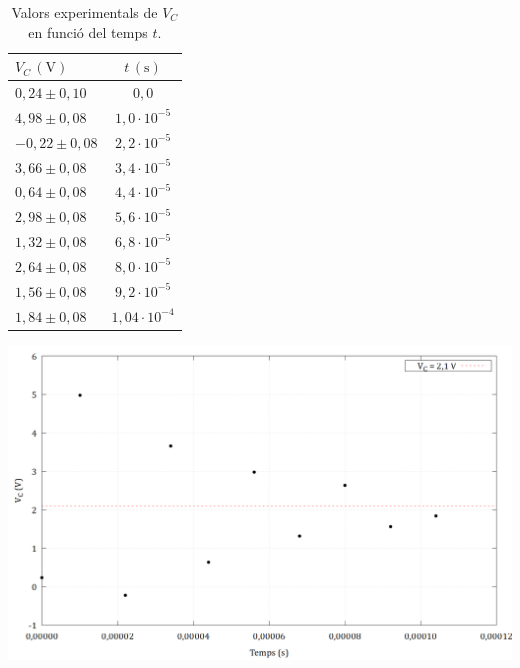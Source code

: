 \documentclass[a4paper,10.5pt]{report}
\begin{document}
\begin{table}[H]
	\centering
	\small
	\begin{minipage}{0.28\textwidth}
		\centering
		\caption{Valors experimentals de $V_C$ en funció del temps $t$.}
		\begin{tabular}{lc}
			\toprule
			$V_C \, (\text{V})$ & $t\,(\text{s})$ \\
			\midrule
			$0{,}24 \pm 0{,}10$ & $0{,}0 $ \\
			$4{,}98 \pm 0{,}08$ & $1{,}0 \cdot 10^{-5}$ \\
			$-0{,}22 \pm 0{,}08$ & $2{,}2 \cdot 10^{-5}$ \\
			$3{,}66 \pm 0{,}08$ & $3{,}4 \cdot 10^{-5}$ \\
			$0{,}64 \pm 0{,}08$ & $4{,}4 \cdot 10^{-5}$ \\
			$2{,}98 \pm 0{,}08$ & $5{,}6 \cdot 10^{-5}$ \\
			$1{,}32 \pm 0{,}08$ & $6{,}8 \cdot 10^{-5}$ \\
			$2{,}64 \pm 0{,}08$ & $8{,}0 \cdot 10^{-5}$ \\
			$1{,}56 \pm 0{,}08$ & $9{,}2 \cdot 10^{-5}$ \\
			$1{,}84 \pm 0{,}08$ & $1{,}04 \cdot 10^{-4}$ \\
			\bottomrule
		\end{tabular}
		\label{tab:3.7}
	\end{minipage}%
	\hfill
	\begin{minipage}{0.68\textwidth}
		\centering
		\includegraphics[width=\linewidth]{vc_vs_t.png} 
		\label{fig:3.6}
	\end{minipage}
\end{table}
\end{document}
